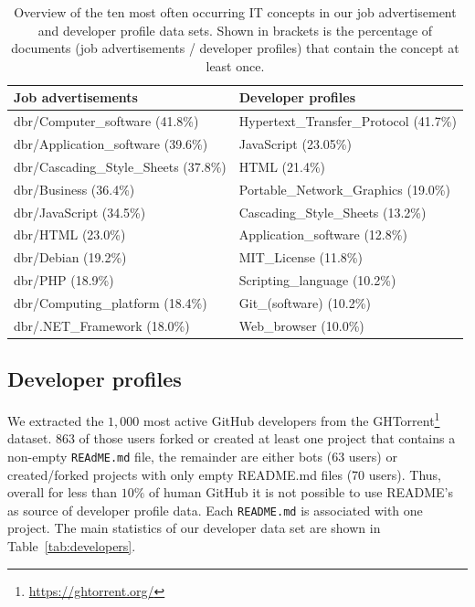 \documentclass[conference]{IEEEtran}
\begin{document}
\begin{table}
\centering
\footnotesize
\begin{tabular}{ll}
\toprule
\textbf{Job advertisements}	& \textbf{Developer profiles}\\
\midrule
dbr/Computer\_software (41.8\%) 			& Hypertext\_Transfer\_Protocol (41.7\%) \\
dbr/Application\_software (39.6\%)			& JavaScript (23.05\%) \\
dbr/Cascading\_Style\_Sheets (37.8\%)	& HTML (21.4\%) \\
dbr/Business (36.4\%)								& Portable\_Network\_Graphics (19.0\%)\\
dbr/JavaScript (34.5\%)							& Cascading\_Style\_Sheets (13.2\%)\\
dbr/HTML (23.0\%)									& Application\_software (12.8\%) \\
dbr/Debian (19.2\%)								& MIT\_License (11.8\%) \\
dbr/PHP (18.9\%)										& Scripting\_language (10.2\%) \\
dbr/Computing\_platform (18.4\%)		& Git\_(software) (10.2\%) \\
dbr/.NET\_Framework (18.0\%)				& Web\_browser (10.0\%)\\
\bottomrule
\end{tabular}
\caption{Overview of the ten most often occurring IT concepts in our job advertisement and developer profile data sets. Shown in brackets is the percentage of documents (job advertisements / developer profiles) that contain the concept at least once.}
\label{tab:top10}
\end{table}

\subsection{Developer profiles}

We extracted the $1,000$ most active GitHub developers from the GHTorrent\footnote{\url{https://ghtorrent.org/}} dataset. 863 of those users forked or created at least one project that contains a non-empty \texttt{REAdME.md} file, the remainder are either bots (63 users) or created/forked projects with only empty README.md files (70 users). Thus, overall for less than $10\%$ of human GitHub it is not possible to use README's as source of developer profile data. Each \texttt{README.md} is associated with one project. The main statistics of our developer data set are shown in Table~\ref{tab:developers}. 
\end{document}
